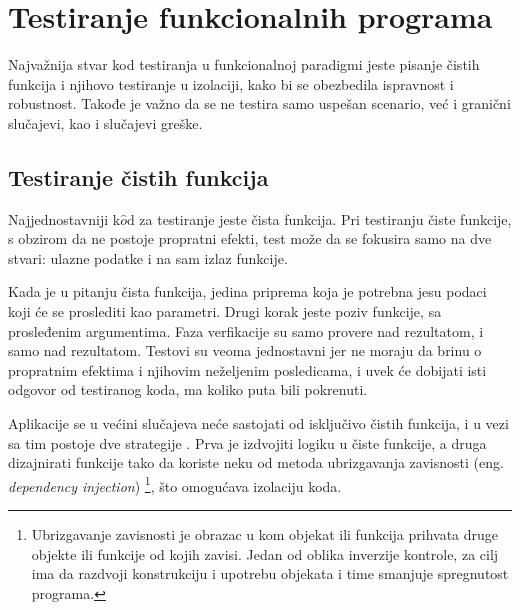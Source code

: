 \documentclass[12pt,oneside]{memoir}
\begin{document}
\section{Testiranje funkcionalnih programa}

\par Najvažnija stvar kod testiranja u funkcionalnoj paradigmi jeste pisanje čistih funkcija i njihovo testiranje u izolaciji, kako bi se obezbedila ispravnost i robustnost. Takođe je važno da se ne testira samo uspešan scenario, već i granični slučajevi, kao i slučajevi greške.

\subsection{Testiranje čistih funkcija}

\par Najjednostavniji k$\hat{o}$d za testiranje jeste čista funkcija. Pri testiranju čiste funkcije, s obzirom da ne postoje propratni efekti, test može da se fokusira samo na dve stvari: ulazne podatke i na sam izlaz funkcije. 
\par Kada je u pitanju čista funkcija, jedina priprema koja je potrebna jesu podaci koji će se proslediti kao parametri. Drugi korak jeste poziv funkcije, sa prosleđenim argumentima. Faza verfikacije su samo provere nad rezultatom, i samo nad rezultatom. Testovi su veoma jednostavni jer ne moraju da brinu o propratnim efektima i njihovim neželjenim posledicama, i uvek će dobijati  isti odgovor od testiranog koda, ma koliko puta bili pokrenuti. 
\par Aplikacije se u većini slučajeva neće sastojati od isključivo čistih funkcija, i u vezi sa tim postoje dve strategije \cite{testingelixir}. Prva je izdvojiti logiku u čiste funkcije, a druga dizajnirati funkcije tako da koriste neku od metoda ubrizgavanja zavisnosti (eng. \textit{dependency injection}) \footnote{Ubrizgavanje zavisnosti je obrazac u kom objekat ili funkcija prihvata druge objekte ili funkcije od kojih zavisi. Jedan od oblika inverzije kontrole, za cilj ima da razdvoji konstrukciju i upotrebu objekata i time smanjuje spregnutost programa.}, što omogućava izolaciju koda.
\end{document}
